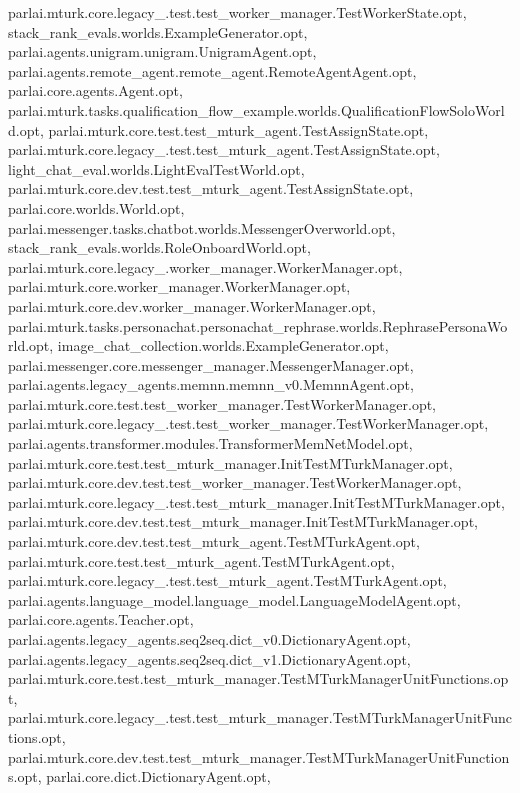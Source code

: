 parlai.\+mturk.\+core.\+legacy\+\_.\+test.\+test\+\_\+worker\+\_\+manager.\+Test\+Worker\+State.\+opt, stack\+\_\+rank\+\_\+evals.\+worlds.\+Example\+Generator.\+opt, parlai.\+agents.\+unigram.\+unigram.\+Unigram\+Agent.\+opt, parlai.\+agents.\+remote\+\_\+agent.\+remote\+\_\+agent.\+Remote\+Agent\+Agent.\+opt, parlai.\+core.\+agents.\+Agent.\+opt, parlai.\+mturk.\+tasks.\+qualification\+\_\+flow\+\_\+example.\+worlds.\+Qualification\+Flow\+Solo\+World.\+opt, parlai.\+mturk.\+core.\+test.\+test\+\_\+mturk\+\_\+agent.\+Test\+Assign\+State.\+opt, parlai.\+mturk.\+core.\+legacy\+\_.\+test.\+test\+\_\+mturk\+\_\+agent.\+Test\+Assign\+State.\+opt, light\+\_\+chat\+\_\+eval.\+worlds.\+Light\+Eval\+Test\+World.\+opt, parlai.\+mturk.\+core.\+dev.\+test.\+test\+\_\+mturk\+\_\+agent.\+Test\+Assign\+State.\+opt, parlai.\+core.\+worlds.\+World.\+opt, parlai.\+messenger.\+tasks.\+chatbot.\+worlds.\+Messenger\+Overworld.\+opt, stack\+\_\+rank\+\_\+evals.\+worlds.\+Role\+Onboard\+World.\+opt, parlai.\+mturk.\+core.\+legacy\+\_.\+worker\+\_\+manager.\+Worker\+Manager.\+opt, parlai.\+mturk.\+core.\+worker\+\_\+manager.\+Worker\+Manager.\+opt, parlai.\+mturk.\+core.\+dev.\+worker\+\_\+manager.\+Worker\+Manager.\+opt, parlai.\+mturk.\+tasks.\+personachat.\+personachat\+\_\+rephrase.\+worlds.\+Rephrase\+Persona\+World.\+opt, image\+\_\+chat\+\_\+collection.\+worlds.\+Example\+Generator.\+opt, parlai.\+messenger.\+core.\+messenger\+\_\+manager.\+Messenger\+Manager.\+opt, parlai.\+agents.\+legacy\+\_\+agents.\+memnn.\+memnn\+\_\+v0.\+Memnn\+Agent.\+opt, parlai.\+mturk.\+core.\+test.\+test\+\_\+worker\+\_\+manager.\+Test\+Worker\+Manager.\+opt, parlai.\+mturk.\+core.\+legacy\+\_.\+test.\+test\+\_\+worker\+\_\+manager.\+Test\+Worker\+Manager.\+opt, parlai.\+agents.\+transformer.\+modules.\+Transformer\+Mem\+Net\+Model.\+opt, parlai.\+mturk.\+core.\+test.\+test\+\_\+mturk\+\_\+manager.\+Init\+Test\+M\+Turk\+Manager.\+opt, parlai.\+mturk.\+core.\+dev.\+test.\+test\+\_\+worker\+\_\+manager.\+Test\+Worker\+Manager.\+opt, parlai.\+mturk.\+core.\+legacy\+\_.\+test.\+test\+\_\+mturk\+\_\+manager.\+Init\+Test\+M\+Turk\+Manager.\+opt, parlai.\+mturk.\+core.\+dev.\+test.\+test\+\_\+mturk\+\_\+manager.\+Init\+Test\+M\+Turk\+Manager.\+opt, parlai.\+mturk.\+core.\+dev.\+test.\+test\+\_\+mturk\+\_\+agent.\+Test\+M\+Turk\+Agent.\+opt, parlai.\+mturk.\+core.\+test.\+test\+\_\+mturk\+\_\+agent.\+Test\+M\+Turk\+Agent.\+opt, parlai.\+mturk.\+core.\+legacy\+\_.\+test.\+test\+\_\+mturk\+\_\+agent.\+Test\+M\+Turk\+Agent.\+opt, parlai.\+agents.\+language\+\_\+model.\+language\+\_\+model.\+Language\+Model\+Agent.\+opt, parlai.\+core.\+agents.\+Teacher.\+opt, parlai.\+agents.\+legacy\+\_\+agents.\+seq2seq.\+dict\+\_\+v0.\+Dictionary\+Agent.\+opt, parlai.\+agents.\+legacy\+\_\+agents.\+seq2seq.\+dict\+\_\+v1.\+Dictionary\+Agent.\+opt, parlai.\+mturk.\+core.\+test.\+test\+\_\+mturk\+\_\+manager.\+Test\+M\+Turk\+Manager\+Unit\+Functions.\+opt, parlai.\+mturk.\+core.\+legacy\+\_.\+test.\+test\+\_\+mturk\+\_\+manager.\+Test\+M\+Turk\+Manager\+Unit\+Functions.\+opt, parlai.\+mturk.\+core.\+dev.\+test.\+test\+\_\+mturk\+\_\+manager.\+Test\+M\+Turk\+Manager\+Unit\+Functions.\+opt, parlai.\+core.\+dict.\+Dictionary\+Agent.\+opt, 